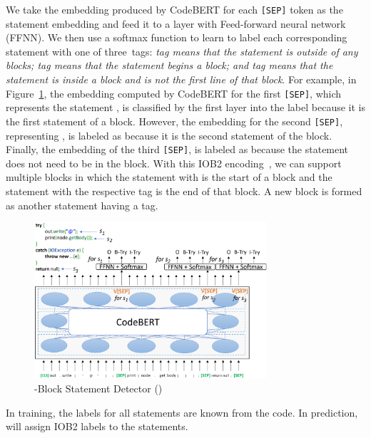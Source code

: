 We take the embedding produced by CodeBERT for each \texttt{[SEP]} token
as the statement embedding and feed it to a layer with Feed-forward
neural network (FFNN). We then use a softmax function to learn to
label each corresponding statement with one of three~tags: {\em
   tag means that the statement is outside of any
   blocks;  tag means that the statement
  begins a  block; and  tag means that the
  statement is inside a  block and is not the first
  line of that block}. For example, in Figure~\ref{fig:xstate}, the
embedding computed by CodeBERT for the first \texttt{[SEP]}, which
represents the statement , is classified by the
first  layer into the  label
because it is the first statement of a 
block. However, the embedding for the second \texttt{[SEP]}, representing
, is labeled as  because it
is the second statement of the  block. Finally, the
embedding of the third \texttt{[SEP]}, is labeled as  because the
statement  does not need to be in the
 block. With this IOB2 encoding~\cite{iob2}, we can
support multiple  blocks in which the statement with
 is the start of a  block and the
statement with the respective  tag is the end of that
block. A new block is formed as another statement having a
 tag.

\begin{figure}[t]
 	\centering
 	\includegraphics[width=3.4in]{xstate-5.png} %
        \vspace{-18pt}
 	\caption{-Block Statement Detector ({\xstate})}
 	\label{fig:xstate}	
\end{figure}


In training, the labels for all statements are known from the
code. In  prediction, {\tool} will assign IOB2 labels to the
statements.

